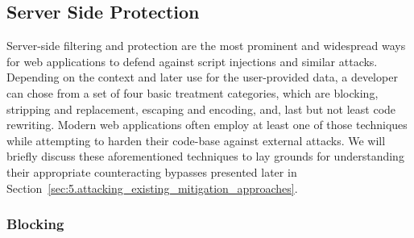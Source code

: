   \subsection{Server Side Protection}
  \label{subsec:4.3.server_side_filtering}

    Server-side filtering and protection are the most prominent and widespread ways for web applications to defend against script injections and similar attacks. Depending on the context and later use for the user-provided data, a developer can chose from a set of four basic treatment categories, which are blocking, stripping and replacement, escaping and encoding, and, last but not least code rewriting. Modern web applications often employ at least one of those techniques while attempting to harden their code-base against external attacks. We will briefly discuss these aforementioned techniques to lay grounds for understanding their appropriate counteracting bypasses presented later in Section~\ref{sec:5.attacking_existing_mitigation_approaches}.

    \subsubsection{Blocking}
    \label{subsubsec:4.3.1.blocking}

